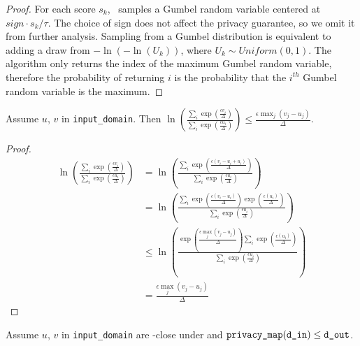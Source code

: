 \documentclass{article}
\begin{document}
\begin{proof}
    For each score $s_k$, \function\ samples a Gumbel random variable centered at $sign \cdot s_k / \tau$.
    The choice of sign does not affect the privacy guarantee, so we omit it from further analysis.
    Sampling from a Gumbel distribution is equivalent to adding a draw from $-\ln(-\ln(U_k))$, where $U_k \sim Uniform(0, 1)$.
    The algorithm only returns the index of the maximum Gumbel random variable,
    therefore the probability of returning $i$ is the probability that the $i^{th}$ Gumbel random variable is the maximum.
\end{proof}

\begin{lemma}
    \label{priv-inequality}
    Assume $u$, $v$ in \texttt{input\_domain}. Then
    $\ln\left(\frac{\sum_{i} \exp(\frac{\epsilon v_i}{\Delta})}{\sum_{i} \exp(\frac{\epsilon u_i}{\Delta})}\right) \le \frac{\epsilon \max_j (v_j - u_j)}{\Delta}$.
\end{lemma}

\begin{proof}
\begin{align*}
    \ln\left(\frac{\sum_{i} \exp(\frac{\epsilon v_i}{\Delta})}{\sum_{i} \exp(\frac{\epsilon u_i}{\Delta})}\right)
    &= \ln\left(\frac{\sum_{i} \exp(\frac{\epsilon (v_i - u_i + u_i)}{\Delta})}{\sum_{i} \exp(\frac{\epsilon u_i}{\Delta})}\right) \\
    &= \ln\left(\frac{\sum_{i} \exp(\frac{\epsilon (v_i - u_i)}{\Delta})\exp(\frac{\epsilon (u_i)}{\Delta})}{\sum_{i} \exp(\frac{\epsilon u_i}{\Delta})}\right) \\
    &\le \ln\left(\frac{\exp(\frac{\epsilon \max_j(v_j - u_j)}{\Delta}) \sum_{i} \exp(\frac{\epsilon (u_i)}{\Delta})}{\sum_{i} \exp(\frac{\epsilon u_i}{\Delta})}\right) \\
    &= \frac{\epsilon \max_j(v_j - u_j)}{\Delta}
\end{align*}
\end{proof}

\label{privacy-guarantee}
Assume $u$, $v$ in \texttt{input\_domain} are \din-close under  and $\texttt{privacy\_map}(\texttt{d\_in}) \le \texttt{d\_out}$.
\end{document}
